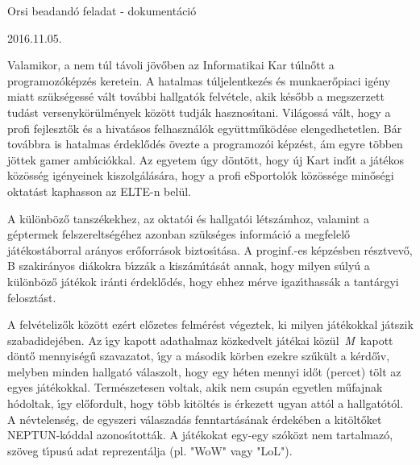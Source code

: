 \documentclass[10pt]{article}
\author{Mikus M\'{a}rk Istv\'{a}n}
\title{}
\begin{document}
\begin{center}
	{\Huge Orsi beadand\'{o} feladat  - dokument\'{a}ci\'{o}}
\end{center}

\begin{center}
	{\large 2016.11.05.}
\end{center}

{\large Valamikor, a nem t\'{u}l t\'{a}voli j\"{o}v\H{o}ben az Informatikai Kar
t\'{u}ln\H{o}tt a programoz\'{o}k\'{e}pz\'{e}s keretein. A hatalmas
t\'{u}ljelentkez\'{e}s \'{e}s munkaer\H{o}piaci ig\'{e}ny miatt
sz\"{u}ks\'{e}gess\'{e} v\'{a}lt tov\'{a}bbi hallgat\'{o}k felv\'{e}tele, akik
k\'{e}s\H{o}bb a megszerzett tud\'{a}st versenyk\"{o}r\"{u}lm\'{e}nyek
k\"{o}z\"{o}tt tudj\'{a}k hasznos\'{\i}tani. Vil\'{a}goss\'{a} v\'{a}lt, hogy a
profi fejleszt\H{o}k \'{e}s a hivat\'{a}sos felhaszn\'{a}l\'{o}k
egy\"{u}ttm\H{u}k\"{o}d\'{e}se elengedhetetlen. B\'{a}r tov\'{a}bbra is hatalmas
\'{e}rdekl\H{o}d\'{e}s \"{o}vezte a programoz\'{o}i k\'{e}pz\'{e}st, \'{a}m egyre
t\"{o}bben j\"{o}ttek gamer amb\'{\i}ci\'{o}kkal. Az egyetem \'{u}gy
d\"{o}nt\"{o}tt, hogy \'{u}j Kart ind\'{\i}t a j\'{a}t\'{e}kos
k\"{o}z\"{o}ss\'{e}g ig\'{e}nyeinek kiszolg\'{a}l\'{a}s\'{a}ra, hogy a profi
eSportol\'{o}k k\"{o}z\"{o}ss\'{e}ge min\H{o}s\'{e}gi oktat\'{a}st kaphasson az
ELTE-n bel\"{u}l.}

{\large A k\"{u}l\"{o}nb\"{o}z\H{o} tansz\'{e}kekhez, az oktat\'{o}i \'{e}s
hallgat\'{o}i l\'{e}tsz\'{a}mhoz, valamint a g\'{e}ptermek
felszerelts\'{e}g\'{e}hez azonban sz\"{u}ks\'{e}ges inform\'{a}ci\'{o} a
megfelel\H{o} j\'{a}t\'{e}kost\'{a}borral ar\'{a}nyos er\H{o}forr\'{a}sok
biztos\'{\i}t\'{a}sa. A proginf.-es k\'{e}pz\'{e}sben r\'{e}sztvev\H{o}, B
szakir\'{a}nyos di\'{a}kokra b\'{\i}zz\'{a}k a kisz\'{a}m\'{\i}t\'{a}s\'{a}t
annak, hogy milyen s\'{u}ly\'{u} a k\"{u}l\"{o}nb\"{o}z\H{o} j\'{a}t\'{e}kok
ir\'{a}nti \'{e}rdekl\H{o}d\'{e}s, hogy ehhez m\'{e}rve igaz\'{\i}thass\'{a}k a
tant\'{a}rgyi feloszt\'{a}st.}

{\large A felv\'{e}teliz\H{o}k k\"{o}z\"{o}tt ez\'{e}rt el\H{o}zetes
felm\'{e}r\'{e}st v\'{e}geztek, ki milyen j\'{a}t\'{e}kokkal j\'{a}tszik
szabadidej\'{e}ben. Az \'{\i}gy kapott adathalmaz k\"{o}zkedvelt j\'{a}t\'{e}kai
k\"{o}z\"{u}l~\textit{M}~kapott d\"{o}nt\H{o} mennyis\'{e}g\H{u} szavazatot,
\'{\i}gy a m\'{a}sodik k\"{o}rben ezekre sz\H{u}k\"{u}lt a k\'{e}rd\H{o}\'{\i}v,
melyben minden hallgat\'{o} v\'{a}laszolt, hogy egy h\'{e}ten mennyi id\H{o}t
(percet) t\"{o}lt az egyes j\'{a}t\'{e}kokkal. Term\'{e}szetesen voltak, akik nem
csup\'{a}n egyetlen m\H{u}fajnak h\'{o}doltak, \'{\i}gy el\H{o}fordult, hogy
t\"{o}bb kit\"{o}lt\'{e}s is \'{e}rkezett ugyan att\'{o}l a hallgat\'{o}t\'{o}l.
A n\'{e}vtelens\'{e}g, de egyszeri v\'{a}laszad\'{a}s fenntart\'{a}s\'{a}nak
\'{e}rdek\'{e}ben a kit\"{o}lt\H{o}ket NEPTUN-k\'{o}ddal azonos\'{\i}tott\'{a}k.
A j\'{a}t\'{e}kokat egy-egy sz\'{o}k\"{o}zt nem tartalmaz\'{o}, sz\"{o}veg
t\'{\i}pus\'{u} adat reprezent\'{a}lja (pl. "WoW" vagy "LoL").}
\end{document}
